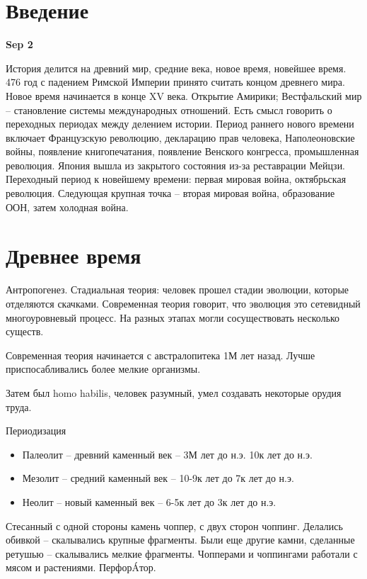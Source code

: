 \documentclass[a4paper, 12pt]{article}
\def\dateis#1{\vspace{\baselineskip}\hfill\textbf{#1}\par}
\begin{document}
\begin{multicols}{2}

\section{Введение}
\dateis{Sep 2}

История делится на древний мир, средние века, новое время, новейшее время. 476 год с падением Римской Империи принято считать концом древнего мира. Новое время начинается в конце XV века. Открытие Амирики; Вестфальский мир -- становление системы международных отношений. Есть смысл говорить о переходных периодах между делением истории. Период раннего нового времени включает Французскую революцию, декларацию прав человека, Наполеоновские войны, появление книгопечатания, появление Венского конгресса, промышленная революция. Япония вышла из закрытого состояния из-за реставрации Мейцзи. Переходный период к новейшему времени: первая мировая война, октябрьская революция. Следующая крупная точка -- вторая мировая война, образование ООН, затем холодная война.


\section{Древнее время}

Антропогенез. 
Стадиальная теория: человек прошел стадии эволюции, которые отделяются скачками. 
Современная теория говорит, что эволюция это сетевидный многоуровневый процесс. На разных этапах могли сосуществовать несколько существ. 

Современная теория начинается с австралопитека 1М лет назад. Лучше приспосабливались более мелкие организмы. 

Затем был homo habilis, человек разумный, умел создавать некоторые орудия труда. 

Периодизация
\begin{itemize}[noitemsep]
\item Палеолит -- древний каменный век -- 3М лет до н.э. 10к лет до н.э.
\item Мезолит -- средний каменный век -- 10-9к лет до 7к лет до н.э.
\item Неолит -- новый каменный век -- 6-5к лет до 3к лет до н.э.
\end{itemize}

Стесанный с одной стороны камень чоппер, с двух сторон чоппинг. Делались обивкой -- скалывались крупные фрагменты. Были еще другие камни, сделанные ретушью -- скалывались мелкие фрагменты. Чопперами и чоппингами работали с мясом и растениями. Перфор\'Aтор. 


\end{multicols}
\end{document}
